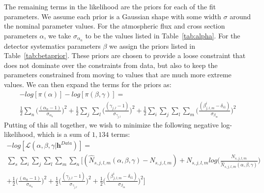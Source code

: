 {The remaining terms in the likelihood are the priors for each of the fit
parameters.  We assume each prior is a Gaussian shape with some width
$\sigma$ around the nominal parameter values.  For the atmospheric flux and
cross section parameters $\alpha$, we take $\sigma_{\alpha_{n}}$ to be the
values listed in Table~\ref{tab:alpha}.  For the detector systematics
parameters $\beta$ we assign the priors listed in Table~\ref{tab:betaprior}.
These priors are chosen to provide a loose constraint that does not dominate
over the constraints from data, but also to keep the parameters constrained
from moving to values that are much more extreme values.  We can then expand
the terms for the priors as:
%
\begin{gather*}
  \label{eq:logpriors}
  - log[\pi(\alpha)] - log[\pi(\beta,\gamma)] = \\ \frac{1}{2}
  \sum\limits_{n}^{} \bigg(\frac{(\alpha_{n} - 1)}{\sigma_{\alpha_{n}}}\bigg)^{2} +
   \frac{1}{2} \sum\limits_{j}^{} \sum\limits_{l}^{} 
  \bigg(\frac{(\gamma_{j,l} - 1)}{\sigma_{\gamma_{j,l}}}\bigg)^{2} + 
   \frac{1}{2} \sum\limits_{i}^{} \sum\limits_{j}^{} \sum\limits_{l}^{} \sum\limits_{m}^{}
  \bigg(\frac{(\beta_{j,l,m}^{i} - \delta_{i1})}{\sigma_{\beta_{m}}}\bigg)^{2}  
\end{gather*}
%
Putting of this all together, we wish to minimize the following negative log-likelihood, which is a
sum of $1,134$ terms:
%
\begin{equation}
 \begin{gathered}
  -log[\mathcal{L}(\alpha,\beta,\gamma | \mathbf{h}^{Data}  )] = \\
  \sum\limits_{s}^{} \sum\limits_{i}^{}  \sum\limits_{j}^{} \sum\limits_{l}^{} \sum\limits_{m}^{} \sum\limits_{n}^{}
  \bigg[ (\hat{N}_{s,j,l,m}(\alpha,\beta,\gamma) - N_{s,j,l,m})
    + N_{s,j,l,m}log\bigg(\frac{N_{s,j,l,m}}{\hat{N}_{s,j,l,m}(\alpha,\beta,\gamma)}\bigg) \\
  + \frac{1}{2}\bigg(\frac{(\alpha_{n} - 1)}{\sigma_{\alpha_{n}}}\bigg)^{2}
  + \frac{1}{2}\bigg(\frac{(\gamma_{j,l} - 1)}{\sigma_{\gamma_{j,l}}}\bigg)^{2} 
  + \frac{1}{2}\bigg(\frac{(\beta_{j,l,m}^{i} - \delta_{i1})}{\sigma_{\beta_{m}}}\bigg)^{2} \bigg] 
 \end{gathered}
 \label{eq:likefull}
\end{equation}


}
